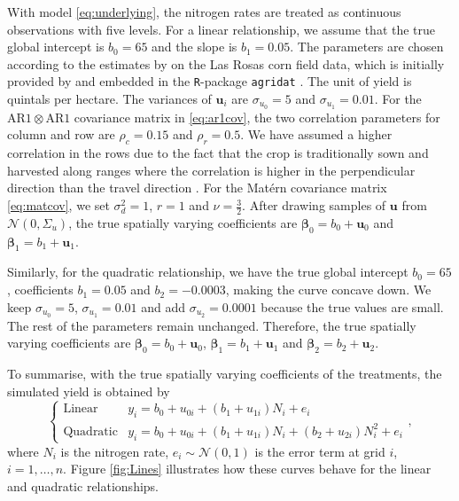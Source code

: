 \documentclass[a4paper]{article} 	%
\newcommand{\Matern}{Mat\'ern }
\newcommand{\N}{\mathcal{N}}
\newcommand{\AR}{\mathrm{AR1}}
\begin{document}
With model \eqref{eq:underlying}, the nitrogen rates are treated as continuous observations with five levels. For a linear relationship, we assume that the true global intercept is $b_0 = 65$ and the slope is $b_1=0.05$. The parameters are chosen according to the estimates by \textcite{Rakshit2020Novel, Cao2022Bayesian} on the Las Rosas corn field data, which is initially provided by \textcite{Luc2004ASpatial} and embedded in the \texttt{R}-package \texttt{agridat} \parencite{White2008Agridat}. The unit of yield is quintals per hectare. The variances of $\bm{u}_i$ are $\sigma_{u_0} = 5$ and $\sigma_{u_1}=0.01$. For the $\AR\otimes\AR$ covariance matrix in \eqref{eq:ar1cov}, the two correlation parameters for column and row are $\rho_c = 0.15$ and $\rho_r=0.5$. We have assumed a higher correlation in the rows due to the fact that the crop is traditionally sown and harvested along ranges where the correlation is higher in the perpendicular direction than the travel direction \parencite{Marchant2019Establishinga}. For the \Matern covariance matrix \eqref{eq:matcov}, we set $\sigma_d^2=1$, $r=1$ and $\nu = \frac{3}{2}$. After drawing samples of $\bm{u}$ from $\N(0,\Sigma_u)$, the true spatially varying coefficients are $\bm{\beta}_0 = b_0 + \bm{u}_0$ and $\bm{\beta}_1 = b_1 + \bm{u}_1$. 

Similarly, for the quadratic relationship, we have the true global intercept $b_0 = 65$, coefficients $b_1 = 0.05$ and $b_2 = -0.0003$, 
making the curve concave down. We keep $\sigma_{u_0} = 5$, $\sigma_{u_1}=0.01$ and add $\sigma_{u_2}=0.0001$ because the true values are small. The rest of the parameters remain unchanged. Therefore, the true spatially varying coefficients are $\bm{\beta}_0 = b_0 + \bm{u}_0$, $\bm{\beta}_1 = b_1 + \bm{u}_1$ and $\bm{\beta}_2 = b_2 + \bm{u}_2$.

To summarise, with the true spatially varying coefficients of the treatments, the simulated yield is obtained by 
\begin{equation}
\begin{cases}
	\text{Linear}  &y_i = b_0 + u_{0i} + (b_1 + u_{1i})N_i + e_i \\
	\text{Quadratic} &y_i = b_0 + u_{0i} + (b_1 + u_{1i})N_i + (b_2 + u_{2i})N_i^2 + e_i
\end{cases},
\end{equation}
where $N_i$ is the nitrogen rate, $e_i\sim \N(0,1)$ is the error term at grid $i$, $i = 1, \ldots, n$. Figure \ref{fig:Lines} illustrates how these curves behave for the linear and quadratic relationships.
\end{document}

